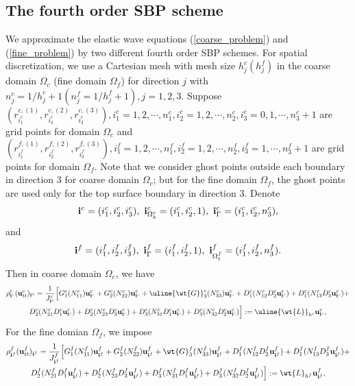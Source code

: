 \subsection{The fourth order SBP scheme}\label{sub_section_4_1}
We approximate the elastic wave equations (\ref{coarse_problem}) and (\ref{fine_problem}) by two different fourth order SBP schemes. For spatial discretization, we use a Cartesian mesh with mesh size $h_j^c (h_j^f)$ in the coarse domain $\Omega_c$ (fine domain $\Omega_f$) for direction $j$ with $n_j^c = 1/h_j^c +1 (n_j^f = 1/h_j^f +1), j = 1,2,3$. Suppose $(r^{c,(1)}_{i_1^c}, r^{c,(2)}_{i_2^c}, r^{c,(3)}_{i_3^c}), i_1^c = 1,2,\cdots,n_1^c, i_2^c = 1,2,\cdots,n_2^c,i_3^c=0,1,\cdots,n_3^c+1$ are grid points for domain $\Omega_c$ and   $(r^{f,(1)}_{i_1^f}, r^{f,(2)}_{i_2^f}, r^{f,(3)}_{i_3^f}), i_1^f = 1,2,\cdots,n_1^f, i_2^f = 1,2,\cdots,n_2^f,i_3^f=1,\cdots,n_3^f+1$ are grid points for domain $\Omega_f$. Note that we consider ghost points outside each boundary in direction $3$ for coarse domain $\Omega_c$; but for the fine domain $\Omega_f$, the ghost points are used only for the top surface boundary in direction $3$. Denote 
\[{\bf i}^c = (i_1^c,i_2^c,i_3^c), \ {\bf i}^c_{\Omega^c_b} = (i_1^c,i_2^c,1),\  {\bf i}^c_{\Gamma} = (i_1^c,i_2^c,n_3^c),\]
and
\[ {\bf i}^f = (i_1^f,i_2^f,i_3^f), \ {\bf i}^f_{\Gamma} = (i_1^f,i_2^f,1), \ {\bf i}^f_{\Omega_t^f} = (i_1^f,i_2^f,n_3^f).\]
Then in coarse domain $\Omega_c$, we have 
\begin{multline}\label{coarse_scheme}
\rho_{{\bf i}^c}^c ({\bf u}_{tt}^c)_{{\bf i}^c} = \frac{1}{J_{{\bf i}^c}^c}\Big[G_1^c(N_{11}^c){\bf u}_{{\bf i}^c}^c+G_2^c(N_{22}^c){\bf u}_{{\bf i}^c}^c+\uline{\wt{G}}_3^c(N_{33}^c){\bf u}_{{\bf i}^c}^c
+D_1^c(N_{12}^cD_2^c{\bf u}_{{\bf i}^c}^c)+D_1^c(N_{13}^cD_3^c{\bf u}_{{\bf i}^c}^c)
+\\D_2^c(N_{21}^cD_1^c{\bf u}_{{\bf i}^c}^c)+D_2^c(N_{23}^cD_3^c{\bf u}_{{\bf i}^c}^c)
+D_3^c(N_{31}^cD_1^c{\bf u}_{{\bf i}^c}^c)
+D_3^c(N_{32}^cD_2^c{\bf u}_{{\bf i}^c}^c)\Big] := \uline{\wt{L}}_{h^c} {\bf{u}}^c_{{\bf i}^c},
\end{multline}
For the fine domian $\Omega_f$, we impose
\begin{multline}\label{fine_scheme_2}
\rho_{{\bf i}^f}^f ({\bf u}_{tt}^f)_{{\bf i}^f} =
\frac{1}{J_{{\bf i}^f}^f}\Big[G_1^f(N_{11}^f){\bf u}_{{\bf i}^f}^f+G_2^f(N_{22}^f){\bf u}_{{\bf i}^f}^f+\wt{G}_3^f(N_{33}^f){\bf u}_{{\bf i}^f}^f
+D_1^f(N_{12}^fD_2^f{\bf u}_{{\bf i}^f}^f)+D_1^f(N_{13}^fD_3^f{\bf u}_{{\bf i}^f}^f)
+\\D_2^f(N_{21}^fD_1^f{\bf u}_{{\bf i}^f}^f)+D_2^f(N_{23}^fD_3^f{\bf u}_{{\bf i}^f}^f)
+D_3^f(N_{31}^fD_1^f{\bf u}_{{\bf i}^f}^f)+D_3^f(N_{32}^fD_2^f{\bf u}_{{\bf i}^f}^f)\Big] 
:= \wt{L}_{h^f}{\bf{u}}^f_{{\bf i}^f},
\end{multline}
